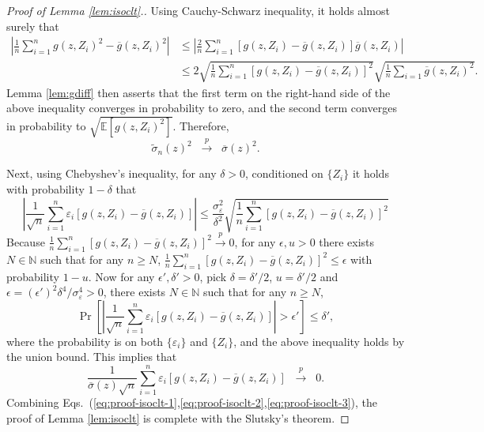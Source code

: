 \documentclass[11pt,a4paper]{article}
\renewcommand{\tilde}{\widetilde}
\renewcommand{\bar}{\overline}
\theoremstyle{definition}
\theoremstyle{plain}
\theoremstyle{remark}
\newcommand{\pd}[1]{
	{ \color{blue} PD: #1}
}
\begin{document}
\begin{proof}[Proof of Lemma \ref{lem:isoclt}.]
%
%

Using Cauchy-Schwarz inequality, it holds almost surely that
\begin{align*}
\left|\frac{1}{n}\sum_{i=1}^n g(z,Z_i)^2-\bar g(z,Z_i)^2\right| &\leq \left|\frac{2}{n}\sum_{i=1}^n [g(z,Z_i)-\bar g(z,Z_i)]\bar g(z,Z_i)\right|\\
&\leq 2\sqrt{\frac{1}{n}\sum_{i=1}^n[g(z,Z_i)-\bar g(z,Z_i)]^2}\sqrt{\frac{1}{n}\sum_{i=1}\bar g(z,Z_i)^2}.
\end{align*}
Lemma \ref{lem:gdiff} then asserts that the first term on the right-hand side of the above inequality converges in probability to zero, and the second term converges in probability to $\sqrt{\mathbb E[g(z,Z_i)^2]}$.
Therefore,
\begin{equation}
\tilde\sigma_n(z)^2 \;\;\overset{p}{\to}\;\; \bar\sigma(z)^2.
\label{eq:proof-isoclt-2}
\end{equation}

Next, using Chebyshev's inequality, for any $\delta>0$, conditioned on $\{Z_i\}$ it holds with probability $1-\delta$ that
$$
\left|\frac{1}{\sqrt{n}}\sum_{i=1}^n\varepsilon_i[g(z,Z_i)-\bar g(z,Z_i)]\right| \leq \frac{\sigma_\varepsilon^2}{\delta^2}\sqrt{\frac{1}{n}\sum_{i=1}^n[g(z,Z_i)-\bar g(z,Z_i)]^2} 
$$
Because $\frac{1}{n}\sum_{i=1}^n[g(z,Z_i)-\bar g(z,Z_i)]^2\overset{p}{\to}0$, for any $\epsilon,u>0$ there exists $N\in\mathbb N$ such that for any $n\geq N$, $\frac{1}{n}\sum_{i=1}^n[g(z,Z_i)-\bar g(z,Z_i)]^2\leq\epsilon$
with probability $1-u$.
Now for any $\epsilon',\delta'>0$, pick $\delta=\delta'/2$, $u=\delta'/2$ and $\epsilon=(\epsilon')^2\delta^4/\sigma_\varepsilon^4>0$, there exists $N\in\mathbb N$ such that for any $n\geq N$, 
$$
\Pr\left[\left|\frac{1}{\sqrt{n}}\sum_{i=1}^n\varepsilon_i[g(z,Z_i)-\bar g(z,Z_i)]\right|>\epsilon'\right]\leq\delta',
$$
where the probability is on both $\{\varepsilon_i\}$ and $\{Z_i\}$, and the above inequality holds by the union bound.
This implies that
\begin{equation}
\frac{1}{\bar\sigma(z)\sqrt{n}}\sum_{i=1}^n\varepsilon_i[g(z,Z_i)-\bar g(z,Z_i)] \;\;\overset{p}{\to}\;\; 0.
\label{eq:proof-isoclt-3}
\end{equation}
Combining Eqs.~(\ref{eq:proof-isoclt-1},\ref{eq:proof-isoclt-2},\ref{eq:proof-isoclt-3}), the proof of Lemma \ref{lem:isoclt} is complete with the Slutsky's theorem.
\end{proof}
\end{document}
